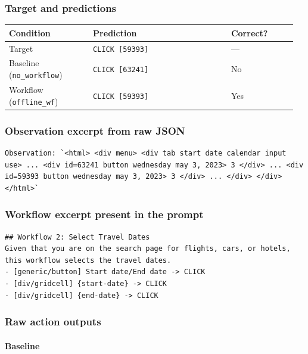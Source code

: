 \subsubsection{Target and
predictions}

{\def\LTcaptype{} %
\begin{longtable}[]{@{}>{\raggedright\arraybackslash}p{0.28\linewidth}>{\raggedright\arraybackslash}p{0.46\linewidth}>{\raggedright\arraybackslash}p{0.22\linewidth}@{}}
\toprule\noalign{}
Condition & Prediction & Correct? \\
\midrule\noalign{}
\endhead
\bottomrule\noalign{}
\endlastfoot
Target & \texttt{CLICK\ {[}59393{]}} & --- \\
Baseline (\texttt{no\_workflow}) & \texttt{CLICK\ {[}63241{]}} & No \\
Workflow (\texttt{offline\_wf}) & \texttt{CLICK\ {[}59393{]}} & Yes \\
\end{longtable}
}

\subsubsection{Observation excerpt from raw
JSON}

\begin{verbatim}
Observation: `<html> <div menu> <div tab start date calendar input use> ... <div id=63241 button wednesday may 3, 2023> 3 </div> ... <div id=59393 button wednesday may 3, 2023> 3 </div> ... </div> </div> </html>`
\end{verbatim}

\subsubsection{Workflow excerpt present in the
prompt}

\begin{verbatim}
## Workflow 2: Select Travel Dates
Given that you are on the search page for flights, cars, or hotels, this workflow selects the travel dates.
- [generic/button] Start date/End date -> CLICK
- [div/gridcell] {start-date} -> CLICK
- [div/gridcell] {end-date} -> CLICK
\end{verbatim}

\subsubsection{Raw action outputs}

\paragraph{Baseline}

